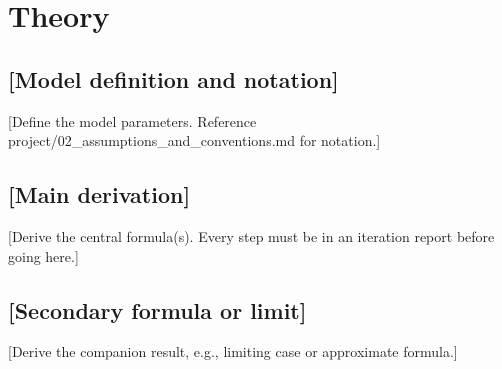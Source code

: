 \section{Theory}
\label{sec:theory}


\subsection{[Model definition and notation]}

[Define the model parameters. Reference project/02_assumptions_and_conventions.md for notation.]

\subsection{[Main derivation]}

[Derive the central formula(s). Every step must be in an iteration report before going here.]

\subsection{[Secondary formula or limit]}

[Derive the companion result, e.g., limiting case or approximate formula.]
